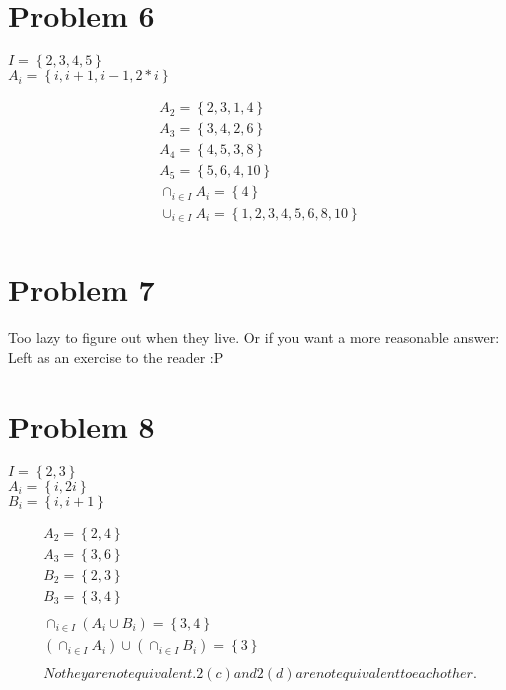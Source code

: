 \documentclass{article}
\begin{document}
\section{Problem 6}
\begin{center}
  $I = \left\{2,3,4,5\right\}$ \\
  $A_i = \left\{i, i+1, i-1, 2*i\right\}$ \\
\end{center}
\begin{align*}
  A_2 = \left\{2,3,1,4\right\} \\
  A_3 = \left\{3,4,2,6\right\} \\
  A_4 = \left\{4,5,3,8\right\} \\
  A_5 = \left\{5,6,4,10\right\} \\
  \cap_{i \in I}A_i = \left\{4 \right\} \\
  \cup_{i \in I}A_i = \left\{1,2,3,4,5,6,8,10 \right\} \\
\end{align*}

\section{Problem 7}
Too lazy to figure out when they live.
Or if you want a more reasonable answer: Left as an exercise to the reader :P
\section{Problem 8}
\begin{center}
  $I = \left\{2,3\right\}$ \\
  $A_i = \left\{ i,2i \right\}$ \\
  $B_i = \left\{ i, i + 1 \right\}$ \\
\end{center}
\begin{align*}
  A_2 = \left\{ 2, 4 \right\} \\
  A_3 = \left\{ 3, 6 \right\} \\
  B_2 = \left\{ 2, 3 \right\} \\
  B_3 = \left\{ 3, 4 \right\} \\ \\
  \cap_{i \in I}(A_i \cup B_i) = \left\{3,4 \right\} \\
  (\cap_{i \in I}A_i) \cup (\cap_{i \in I}B_i) = \left\{ 3\right\} \\ \\
  No they are not equivalent. 2(c) and 2(d) are not equivalent to each other.
\end{align*}
\end{document}
